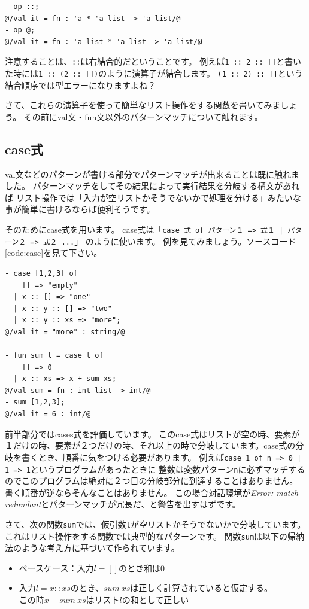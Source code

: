 \documentclass[11pt,a4paper]{article}
\begin{document}
\begin{lstlisting}[caption=リスト操作演算子の型,label=code:list-operators]
- op ::;
@/val it = fn : 'a * 'a list -> 'a list/@
- op @;
@/val it = fn : 'a list * 'a list -> 'a list/@
\end{lstlisting}

注意することは、\lstinline{::}は右結合的だということです。
例えば\lstinline{1 :: 2 :: []}と書いた時には\lstinline{1 :: (2 :: [])}のように演算子が結合します。
\lstinline{(1 :: 2) :: []}という結合順序では型エラーになりますよね？

さて、これらの演算子を使って簡単なリスト操作をする関数を書いてみましょう。
その前にval文・fun文以外のパターンマッチについて触れます。

\subsection{case式}

val文などのパターンが書ける部分でパターンマッチが出来ることは既に触れました。
パターンマッチをしてその結果によって実行結果を分岐する構文があれば
リスト操作では「入力が空リストかそうでないかで処理を分ける」みたいな事が簡単に書けるならば便利そうです。

そのためにcase式を用います。
case式は「\lstinline{case 式 of パターン１ => 式１ | パターン２ => 式２ ...}」
のように使います。
例を見てみましょう。ソースコード\ref{code:case}を見て下さい。

\begin{lstlisting}[caption=case式,label=code:case]
- case [1,2,3] of
    [] => "empty"
  | x :: [] => "one"
  | x :: y :: [] => "two"
  | x :: y :: xs => "more";
@/val it = "more" : string/@

- fun sum l = case l of
    [] => 0
  | x :: xs => x + sum xs;
@/val sum = fn : int list -> int/@
- sum [1,2,3];
@/val it = 6 : int/@
\end{lstlisting}

前半部分ではcases式を評価しています。
このcase式はリストが空の時、要素が１だけの時、要素が２つだけの時、それ以上の時で分岐しています。case式の分岐を書くとき、順番に気をつける必要があります。
例えば\lstinline{case 1 of n => 0 | 1 => 1}というプログラムがあったときに
整数は変数パターン\lstinline{n}に必ずマッチするのでこのプログラムは絶対に２つ目の分岐部分に到達することはありません。
書く順番が逆ならそんなことはありません。
この場合対話環境が\textit{Error: match redundant}とパターンマッチが冗長だ、と警告を出すはずです。

さて、次の関数\lstinline{sum}では、仮引数\lstinline{l}が空リストかそうでないかで分岐しています。
これはリスト操作をする関数では典型的なパターンです。
関数\lstinline{sum}は以下の帰納法のような考え方に基づいて作られています。
\begin{itemize}
\item ベースケース：入力$l = []$のとき和は0
\item 入力$l = x :: xs$のとき、$sum \ xs$は正しく計算されていると仮定する。\\
  この時$x + sum \ xs$はリスト$l$の和として正しい
\end{itemize}
\end{document}
